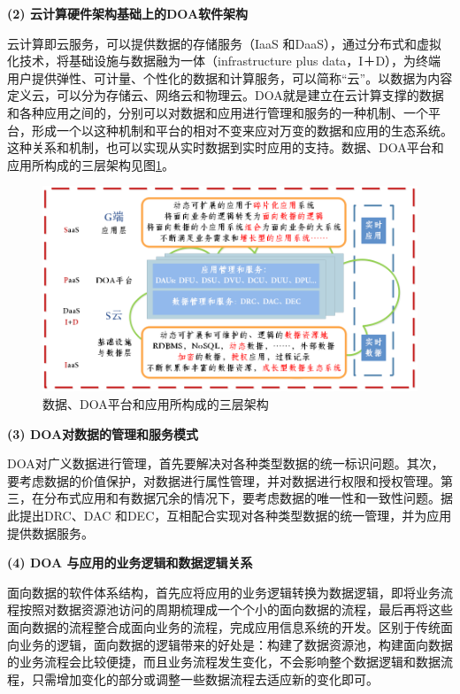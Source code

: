 \documentclass[article]{BJTU-thesis}
\begin{document}
	\noindent\textbf{(2) 云计算硬件架构基础上的DOA软件架构}
	
	云计算即云服务，可以提供数据的存储服务（IaaS 和DaaS），通过分布式和虚拟化技术，将基础设施与数据融为一体（infrastructure
	plus data，I＋D），为终端用户提供弹性、可计量、个性化的数据和计算服务，可以简称“云”。以数据为内容定义云，可以分为存储云、网络云和物理云。DOA就是建立在云计算支撑的数据和各种应用之间的，分别可以对数据和应用进行管理和服务的一种机制、一个平台，形成一个以这种机制和平台的相对不变来应对万变的数据和应用的生态系统。这种关系和机制，也可以实现从实时数据到实时应用的支持。数据、DOA平台和应用所构成的三层架构见图\ref{fig:fig2}。
	
	
	\begin{figure}[!htbp]
		\centering
		\includegraphics[width=1\textwidth]{2.png}
		\caption{数据、DOA平台和应用所构成的三层架构}
		\label{fig:fig2}
	\end{figure}
	
	\noindent\textbf{(3) DOA对数据的管理和服务模式}
	
	DOA对广义数据进行管理，首先要解决对各种类型数据的统一标识问题。其次，要考虑数据的价值保护，对数据进行属性管理，并对数据进行权限和授权管理。第三，在分布式应用和有数据冗余的情况下，要考虑数据的唯一性和一致性问题。据此提出DRC、DAC 和DEC，互相配合实现对各种类型数据的统一管理，并为应用提供数据服务。
	\newline
	
	\noindent\textbf{(4) DOA 与应用的业务逻辑和数据逻辑关系}
	
	面向数据的软件体系结构，首先应将应用的业务逻辑转换为数据逻辑，即将业务流程按照对数据资源池访问的周期梳理成一个个小的面向数据的流程，最后再将这些面向数据的流程整合成面向业务的流程，完成应用信息系统的开发。区别于传统面向业务的逻辑，面向数据的逻辑带来的好处是：构建了数据资源池，构建面向数据的业务流程会比较便捷，而且业务流程发生变化，不会影响整个数据逻辑和数据流程，只需增加变化的部分或调整一些数据流程去适应新的变化即可。
	
\end{document}
